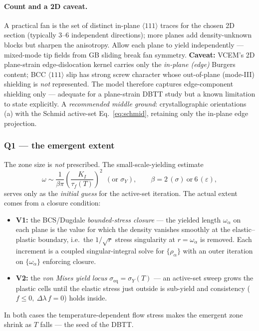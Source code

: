 \documentclass[11pt]{article}
\begin{document}
\paragraph{Count and a 2D caveat.} A practical fan is the set of distinct
in-plane $\langle111\rangle$ traces for the chosen 2D section (typically
$3$--$6$ independent directions); more planes add density-unknown blocks but
sharpen the anisotropy. Allow each plane to yield independently --- mixed-mode
tip fields from GB sliding break fan symmetry. \textbf{Caveat:} VCEM's 2D
plane-strain edge-dislocation kernel carries only the \emph{in-plane (edge)}
Burgers content; BCC $\langle111\rangle$ slip has strong screw character whose
out-of-plane (mode-III) shielding is \emph{not} represented. The model therefore
captures edge-component shielding only --- adequate for a plane-strain DBTT study
but a known limitation to state explicitly. A \emph{recommended middle ground}:
crystallographic orientations (a) with the Schmid active-set
Eq.~\eqref{eq:schmid}, retaining only the in-plane edge projection.

\subsubsection{Q1 --- the emergent extent}
The zone size is \emph{not} prescribed. The small-scale-yielding estimate
\begin{equation}
\omega \sim \frac{1}{\beta\pi}\left(\frac{K_I}{\tau_f(T)}\right)^{2}
\ \ (\text{or }\sigma_Y),\qquad \beta=2\,(\sigma)\ \text{or}\ 6\,(\varepsilon),
\label{eq:rp}
\end{equation}
\citep{irwin1957} serves only as the \emph{initial guess} for the active-set
iteration. The actual extent comes from a closure condition:
\begin{itemize}[leftmargin=1.4em]
\item \textbf{V1:} the BCS/Dugdale \emph{bounded-stress closure}
\citep{bcs1963,dugdale1960} --- the yielded length $\omega_{\alpha}$ on each plane
is the value for which the density vanishes smoothly at the elastic--plastic
boundary, i.e.\ the $1/\sqrt{r}$ stress singularity at $r=\omega_{\alpha}$ is
removed. Each increment is a coupled singular-integral solve for $\{\rho_\alpha\}$
with an outer iteration on $\{\omega_\alpha\}$ enforcing closure.
\item \textbf{V2:} the \emph{von Mises yield locus}
$\sigma_{\mathrm{eq}}=\sigma_Y(T)$ --- an active-set sweep grows the plastic cells
until the elastic stress just outside is sub-yield and consistency
($f\le0,\ \Delta\lambda\,f=0$) holds inside.
\end{itemize}
In both cases the temperature-dependent flow stress makes the emergent zone
shrink as $T$ falls --- the seed of the DBTT.
\end{document}
